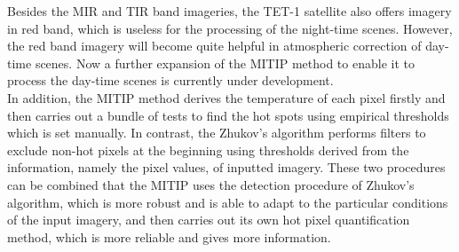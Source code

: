 \noindent Besides the MIR and TIR band imageries, the TET-1 satellite also offers imagery in red band, which is useless for the processing of the night-time scenes. However, the red band imagery will become quite helpful in atmospheric correction of day-time scenes. Now a further expansion of the MITIP method to enable it to process the day-time scenes is currently under development.\\

\noindent In addition, the MITIP method derives the temperature of each pixel firstly and then carries out a bundle of tests to find the hot spots using empirical thresholds which is set manually. In contrast, the Zhukov's algorithm performs filters to exclude non-hot pixels at the beginning using thresholds derived from the information, namely the pixel values, of inputted imagery. These two procedures can be combined that the MITIP uses the detection procedure of Zhukov's algorithm, which is more robust and is able to adapt to the particular conditions of the input imagery, and then carries out its own hot pixel quantification method, which is more reliable and gives more information.\\